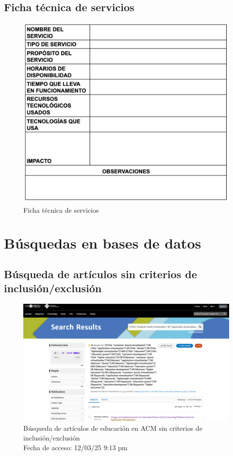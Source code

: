 \section*{Ficha técnica de servicios}
\begin{figure}[htbp]
    \centering
    \includegraphics[width=\textwidth,height=0.85\textheight,keepaspectratio]{apendices/caracterizacionServicios.png}
    \caption{Ficha técnica de servicios}\label{fig:tabla-ficha-servicios}
\end{figure}
\FloatBarrier
\clearpage

\chapter{Búsquedas en bases de datos}
\section*{Búsqueda de artículos sin criterios de inclusión/exclusión}

\begin{figure}[htbp]
    \centering
    \includegraphics[width=\textwidth,keepaspectratio]{apendices/BD/sin-criterios/ACM-ed.png}
    \caption{Búsqueda de artículos de educación en ACM sin criterios de inclusión/exclusión \\
    Fecha de acceso: 12/03/25 9:13 pm
    }\label{fig:busqueda1}
\end{figure}
\FloatBarrier

